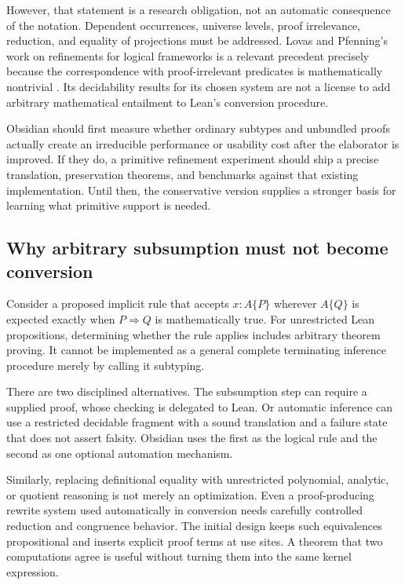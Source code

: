 \documentclass[11pt,a4paper]{article}
\theoremstyle{plain}\newtheorem{proposition}{Proposition}[section]
\theoremstyle{definition}\newtheorem{definition}[proposition]{Definition}
\theoremstyle{remark}\newtheorem{remark}[proposition]{Remark}
\begin{document}
However, that statement is a research obligation, not an automatic consequence of the notation. Dependent occurrences, universe levels, proof irrelevance, reduction, and equality of projections must be addressed. Lovas and Pfenning's work on refinements for logical frameworks is a relevant precedent precisely because the correspondence with proof-irrelevant predicates is mathematically nontrivial \cite{lovas}. Its decidability results for its chosen system are not a license to add arbitrary mathematical entailment to Lean's conversion procedure.

Obsidian should first measure whether ordinary subtypes and unbundled proofs actually create an irreducible performance or usability cost after the elaborator is improved. If they do, a primitive refinement experiment should ship a precise translation, preservation theorems, and benchmarks against that existing implementation. Until then, the conservative version supplies a stronger basis for learning what primitive support is needed.

\subsection{Why arbitrary subsumption must not become conversion}
Consider a proposed implicit rule that accepts \(x:A\{P\}\) wherever \(A\{Q\}\) is expected exactly when \(P\Rightarrow Q\) is mathematically true. For unrestricted Lean propositions, determining whether the rule applies includes arbitrary theorem proving. It cannot be implemented as a general complete terminating inference procedure merely by calling it subtyping.

There are two disciplined alternatives. The subsumption step can require a supplied proof, whose checking is delegated to Lean. Or automatic inference can use a restricted decidable fragment with a sound translation and a failure state that does not assert falsity. Obsidian uses the first as the logical rule and the second as one optional automation mechanism.

Similarly, replacing definitional equality with unrestricted polynomial, analytic, or quotient reasoning is not merely an optimization. Even a proof-producing rewrite system used automatically in conversion needs carefully controlled reduction and congruence behavior. The initial design keeps such equivalences propositional and inserts explicit proof terms at use sites. A theorem that two computations agree is useful without turning them into the same kernel expression.
\end{document}
